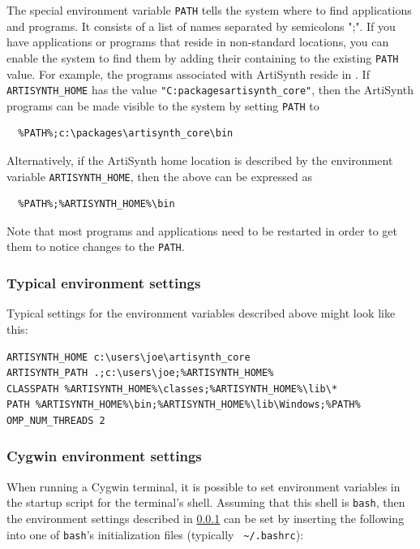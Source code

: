 The special environment variable {\tt PATH} tells the system where to find
applications and programs. It consists of a list of \directory{} names
separated by semicolons ";". If you have applications or programs that
reside in non-standard locations, you can enable the system to find
them by adding their containing \directory{} to the existing {\tt PATH}
value. For example, the programs associated with ArtiSynth reside in
. If {\tt ARTISYNTH\_HOME} has the value
{\tt "C:\SEP packages\SEP artisynth\_core"}, then the ArtiSynth programs
can be made visible to the system by setting {\tt PATH} to

\begin{verbatim}
  %PATH%;c:\packages\artisynth_core\bin
\end{verbatim}

Alternatively, if the ArtiSynth home location is described by
the environment variable {\tt ARTISYNTH\_HOME}, then the
above can be expressed as

\begin{verbatim}
  %PATH%;%ARTISYNTH_HOME%\bin
\end{verbatim}

Note that most programs and applications need to be restarted in order
to get them to notice changes to the {\tt PATH}.

\subsubsection{Typical environment settings}
\label{TypicalEnvironment}

Typical settings for the environment variables described above might
look like this:

\begin{lstlisting}[]
ARTISYNTH_HOME c:\users\joe\artisynth_core
ARTISYNTH_PATH .;c:\users\joe;%ARTISYNTH_HOME%
CLASSPATH %ARTISYNTH_HOME%\classes;%ARTISYNTH_HOME%\lib\*
PATH %ARTISYNTH_HOME%\bin;%ARTISYNTH_HOME%\lib\Windows;%PATH%
OMP_NUM_THREADS 2
\end{lstlisting}

\subsubsection{Cygwin environment settings}
\label{CygwinEnvironmentSettings}

When running a Cygwin terminal, it is possible to set environment
variables in the startup script for the terminal's shell. Assuming
that this shell is {\tt bash}, then the environment settings described
in \ref{TypicalEnvironment} can be set by inserting the following
into one of {\tt bash}'s initialization files (typically {\tt
\textasciitilde/.bashrc}):

